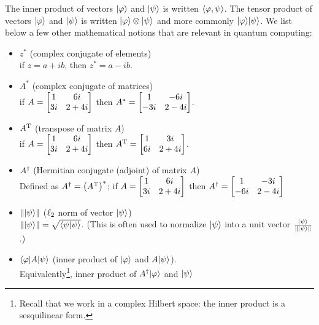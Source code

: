 The inner product of vectors $\ket{\varphi}$ and $\ket{\psi}$ is written $\dotprod{ \varphi }{ \psi }$.
The tensor product of vectors $\ket{\varphi}$ and $\ket{\psi}$ is written $\ket{\varphi} \otimes \ket{\psi}$  and more commonly $\ket{\varphi}\ket{\psi}$.
We list below a few other mathematical notions that are relevant in quantum computing:

\begin{itemize}[-]
\item $z^\ast$ (complex conjugate of elements)\\  if $z=a+ib$, then $z^\ast = a - ib$.
\item $A^\ast$ (complex conjugate of matrices)\\ if $A = \twobytwomatrix[1,6i,3i,2+4i]$ then $A^\ast = \twobytwomatrix[1,-6i,-3i,2-4i]$.
\item $\transpose{A}$  (transpose of matrix $A$)\\ if $A = \twobytwomatrix[1,6i,3i,2+4i]$ then $\transpose{A} = \twobytwomatrix[1,3i,6i,2+4i]$.
\item $\adjoint{A}$  (Hermitian conjugate (adjoint) of matrix $A$)\\
Defined as $\adjoint{A} = \left(\transpose{A}\right)^\ast$; if $A = \twobytwomatrix[1,6i,3i,2+4i]$ then $A^{\dag} = \twobytwomatrix[1,-3i,-6i,2-4i]$
\item $\norm{\ket{\psi}}$ ($\lp[2]$ norm of vector $\ket{\psi}$)\\
$\norm{\ket{\psi}} = \sqrt{\dotproduct[{\psi}, {\psi}]}$. 
 (This is often used to normalize $\ket{\psi}$ into a unit vector $\frac{\ket{\psi}}{\norm{\ket{\psi}}}$.)

\item $\bra{\varphi}A\ket{\psi}$ (inner product of $\ket{\varphi}$ and $A\ket{\psi}$). \\
Equivalently\footnote{Recall that we work in a complex Hilbert space: the inner product is a sesquilinear form.}, inner product of $A^{\dag}\ket{\varphi}$ and $\ket{\psi}$

\end{itemize}

